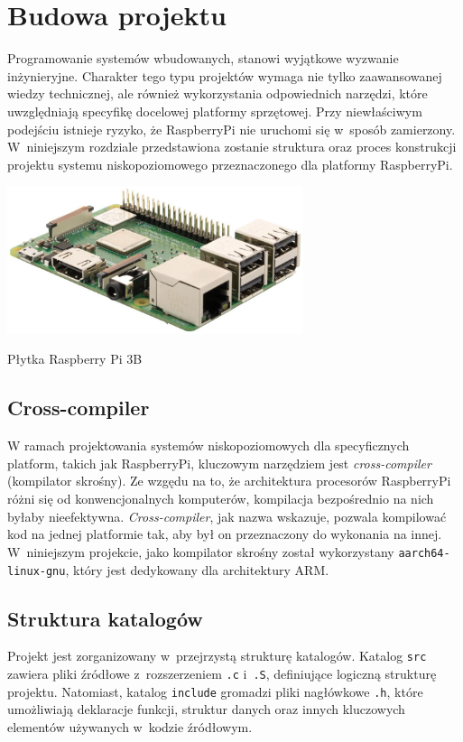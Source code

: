 \documentclass[shortabstract]{iithesis}
\begin{document}
\section{Budowa projektu}
Programowanie systemów wbudowanych, stanowi wyjątkowe wyzwanie inżynieryjne. Charakter tego typu projektów wymaga nie tylko zaawansowanej wiedzy technicznej, ale również wykorzystania odpowiednich narzędzi, które uwzględniają specyfikę docelowej platformy sprzętowej. Przy niewłaściwym podejściu istnieje ryzyko, że RaspberryPi nie uruchomi się w~sposób zamierzony. W~niniejszym rozdziale przedstawiona zostanie struktura oraz proces konstrukcji projektu systemu niskopoziomowego przeznaczonego dla platformy RaspberryPi.

\begingroup
\centering
\includegraphics[width=0.65\textwidth]{rpi3b.jpg}
\captionsetup{type=figure}
\caption{Płytka Raspberry Pi 3B}
\endgroup
\subsection{Cross-compiler}
W ramach projektowania systemów niskopoziomowych dla specyficznych platform, takich jak RaspberryPi, kluczowym narzędziem jest \textit{cross-compiler} (kompilator skrośny). Ze wzgędu na to, że architektura procesorów RaspberryPi różni się od konwencjonalnych komputerów, kompilacja bezpośrednio na nich byłaby nieefektywna. \textit{Cross-compiler}, jak nazwa wskazuje, pozwala kompilować kod na jednej platformie tak, aby był on przeznaczony do wykonania na innej. W~niniejszym projekcie, jako kompilator skrośny został wykorzystany \texttt{aarch64-linux-gnu}, który jest dedykowany dla architektury ARM.
\subsection{Struktura katalogów}
Projekt jest zorganizowany w~przejrzystą strukturę katalogów. Katalog \texttt{src} zawiera pliki źródłowe z~rozszerzeniem \texttt{.c} i~\texttt{.S}, definiujące logiczną strukturę projektu. Natomiast, katalog \texttt{include} gromadzi pliki nagłówkowe \texttt{.h}, które umożliwiają deklaracje funkcji, struktur danych oraz innych kluczowych elementów używanych w~kodzie źródłowym.
\end{document}
